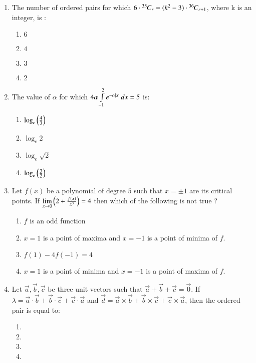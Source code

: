 \documentclass[journal,12pt,twocolumn]{IEEEtran}
\theoremstyle{remark}
\begin{document}
\begin{enumerate}
    \item The number of ordered pairs  for which $6\cdot{{}^{35}\mkern-1muC_{r}}=(k^2-3)\cdot{{}^{36}\mkern-1muC_{r+1}}$, where k is an integer, is :
        \begin{enumerate}
            \item $6$
            \item $4$
            \item $3$
            \item $2$
        \end{enumerate}

    \item The value of $\alpha$ for which $4\alpha\int\limits_{-1}^{2}e^{-\alpha\left\vert x\right\vert}\,dx=5$ is: 
        \begin{enumerate}
            \item $\log_e\left(\frac{4}{3}\right)$
            \item $\log_e2$
            \item $\log_e\sqrt{2}$
            \item $\log_e\left(\frac{3}{2}\right)$
        \end{enumerate}

    \item Let $f(x)$ be a polynomial of degree $5$ such that $x=\pm1$ are its critical points. If $\lim\limits_{x\to0}\left(2+\frac{f(x)}{x^3}\right)=4$ then which of the following is not true ?
        \begin{enumerate}
            \item $f$ is an odd function
            \item $x=1$ is a point of maxima and $x=-1$ is a point of minima of $f$.
            \item $f(1)-4f(-1)=4$
            \item $x=1$ is a point of minima and $x=-1$ is a point of maxima of $f$.
        \end{enumerate}

    \item Let $\vec{a},\vec{b},\vec{c}$ be three unit vectors such that $\vec{a}+\vec{b}+\vec{c}=\vec{0}$. If $\lambda=\vec{a}\cdot\vec{b}+\vec{b}\cdot\vec{c}+\vec{c}\cdot\vec{a}$ and $\vec{d}=\vec{a}\times\vec{b}+\vec{b}\times\vec{c}+\vec{c}\times\vec{a}$, then the ordered pair  is equal to: 
        \begin{enumerate}
            \item {}
            \item {}
            \item {}
            \item {}
        \end{enumerate}


\end{enumerate}
\end{document}
